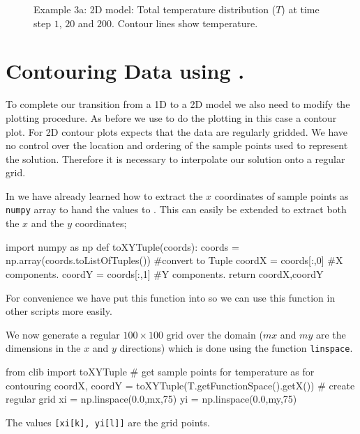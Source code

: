 \begin{figure}[ht]
\caption{Example 3a: 2D model: Total temperature distribution ($T$) at time step
$1$, $20$ and $200$. Contour lines show temperature.}
\label{fig:twodhdans}
\end{figure}

\section{Contouring \esc Data using \modmpl.}
\label{Sec:2DHD plot}
To complete our transition from a 1D to a 2D model we also need to modify the 
plotting procedure. As before we use \modmpl to do the plotting in this case a
contour plot. For 2D contour plots \modmpl expects that the data are regularly
gridded. We have no control over the location and ordering of the sample points
used to represent the solution. Therefore it is necessary to interpolate our
solution onto a regular grid.

In  we have already learned how to extract the $x$
coordinates of sample points as 
\verb|numpy| array to hand the values to \modmpl. This can easily be extended
to extract both the $x$ and the $y$ coordinates;
\begin{python}
import numpy as np
def toXYTuple(coords):
    coords = np.array(coords.toListOfTuples()) #convert to Tuple
    coordX = coords[:,0] #X components.
    coordY = coords[:,1] #Y components.
    return coordX,coordY
\end{python}
For convenience we have put this function into  so we can use
this function in other scripts more easily. 

We now generate a regular $100 \times 100$ grid over the domain ($mx$ and $my$ 
are the dimensions in the $x$ and $y$ directions) which is done using the
\modnumpy function \verb|linspace|.
\begin{python}
from clib import toXYTuple
# get sample points for temperature as  for contouring      
coordX, coordY = toXYTuple(T.getFunctionSpace().getX())
# create regular grid
xi = np.linspace(0.0,mx,75)
yi = np.linspace(0.0,my,75)
\end{python}
The values \verb|[xi[k], yi[l]]| are the grid points.


